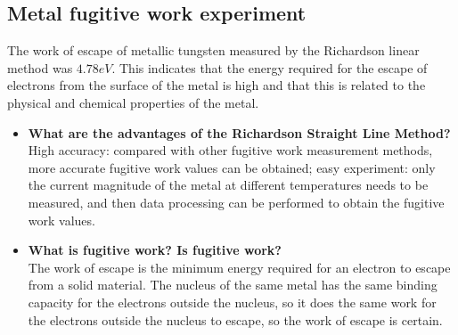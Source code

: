 \documentclass[UTF8]{article}
\begin{document}
\subsection{Metal fugitive work experiment}
The work of escape of metallic tungsten measured by the Richardson linear method was $4.78eV$. This indicates that the energy required for the escape of electrons from the surface of the metal is high and that this is related to the physical and chemical properties of the metal.
\begin{itemize}
\item \textbf{What are the advantages of the Richardson Straight Line Method?}\\
High accuracy: compared with other fugitive work measurement methods, more accurate fugitive work values can be obtained; easy experiment: only the current magnitude of the metal at different temperatures needs to be measured, and then data processing can be performed to obtain the fugitive work values.
\item \textbf{What is fugitive work? Is fugitive work?}\\
The work of escape is the minimum energy required for an electron to escape from a solid material. The nucleus of the same metal has the same binding capacity for the electrons outside the nucleus, so it does the same work for the electrons outside the nucleus to escape, so the work of escape is certain.
\end{itemize}
\end{document}
